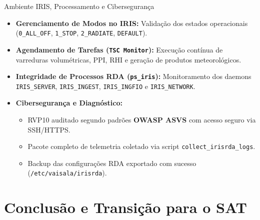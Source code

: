 ﻿\documentclass[aspectratio=169]{beamer}
\begin{document}
\begin{frame}{Ambiente IRIS, Processamento e Ciberseguran{\c{c}}a}
    \begin{itemize}
        \item \textbf{Gerenciamento de Modos no IRIS:} Valida{\c{c}}{\~a}o dos estados operacionais (\texttt{0\_ALL\_OFF}, \texttt{1\_STOP}, \texttt{2\_RADIATE}, \texttt{DEFAULT}).
        \item \textbf{Agendamento de Tarefas (\texttt{TSC Monitor}):} Execu{\c{c}}{\~a}o cont{\'i}nua de varreduras volum{\'e}tricas, PPI, RHI e gera{\c{c}}{\~a}o de produtos meteorol{\'o}gicos.
        \item \textbf{Integridade de Processos RDA (\texttt{ps\_iris}):} Monitoramento dos daemons \texttt{IRIS\_SERVER}, \texttt{IRIS\_INGEST}, \texttt{IRIS\_INGFIO} e \texttt{IRIS\_NETWORK}.
        \item \textbf{Ciberseguran{\c{c}}a e Diagn{\'o}stico:}
        \begin{itemize}
            \item RVP10 auditado segundo padr{\~o}es \textbf{OWASP ASVS} com acesso seguro via SSH/HTTPS.
            \item Pacote completo de telemetria coletado via script \texttt{collect\_irisrda\_logs}.
            \item Backup das configura{\c{c}}{\~o}es RDA exportado com sucesso (\texttt{/etc/vaisala/irisrda}).
        \end{itemize}
    \end{itemize}
\end{frame}

\section{Conclus{\~a}o e Transi{\c{c}}{\~a}o para o SAT}
\end{document}
